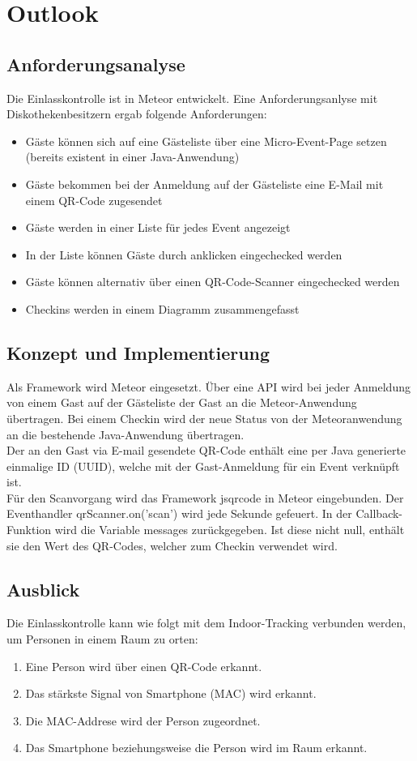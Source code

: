 \documentclass[a4paper]{spie}  %
\begin{document}
\newpage
\appendix
\section{Outlook} \label{subsection:Einlasskontrolle}
\subsection{Anforderungsanalyse}
Die Einlasskontrolle ist in Meteor entwickelt. Eine Anforderungsanlyse mit Diskothekenbesitzern ergab folgende Anforderungen:

\begin{itemize}
\item Gäste können sich auf eine Gästeliste über eine Micro-Event-Page setzen (bereits existent in einer Java-Anwendung)
\item Gäste bekommen bei der Anmeldung auf der Gästeliste eine E-Mail mit einem QR-Code zugesendet
\item Gäste werden in einer Liste für jedes Event angezeigt
\item In der Liste können Gäste durch anklicken eingechecked werden
\item Gäste können alternativ über einen QR-Code-Scanner eingechecked werden
\item Checkins werden in einem Diagramm zusammengefasst
\end{itemize}
\subsection{Konzept und Implementierung}
Als Framework wird Meteor eingesetzt. Über eine API wird bei jeder Anmeldung von einem Gast auf der Gästeliste der Gast an die Meteor-Anwendung übertragen.
Bei einem Checkin wird der neue Status von der Meteoranwendung an die bestehende Java-Anwendung übertragen.
\\
Der an den Gast via E-mail gesendete QR-Code enthält eine per Java generierte einmalige ID (UUID), welche mit der Gast-Anmeldung für ein Event verknüpft ist.
\\
Für den Scanvorgang wird das Framework jsqrcode in Meteor eingebunden. Der Eventhandler qrScanner.on('scan') wird jede Sekunde gefeuert. In der Callback-Funktion wird die Variable messages zurückgegeben. Ist diese nicht null, enthält sie den Wert des QR-Codes, welcher zum Checkin verwendet wird.


\subsection{Ausblick}
Die Einlasskontrolle kann wie folgt mit dem Indoor-Tracking verbunden werden, um Personen in einem Raum zu orten:
\begin{enumerate}
\item Eine Person wird über einen QR-Code erkannt.
\item Das stärkste Signal von Smartphone (MAC) wird erkannt.
\item Die MAC-Addrese wird der Person zugeordnet.
\item Das Smartphone beziehungsweise die Person wird im Raum erkannt.
\end{enumerate}
\end{document}
